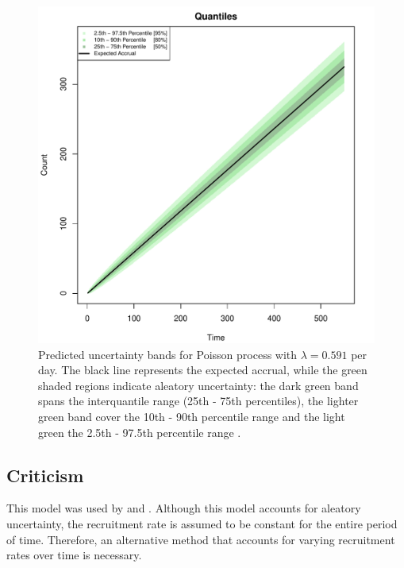 \begin{figure}
\begin{knitrout}
\color{fgcolor}

{\centering \includegraphics[width=\textwidth-3cm]{figure/ch02_figunnamed-chunk-6-1} 

}


\end{knitrout}
  \caption{Predicted uncertainty bands for Poisson process with $\lambda = 0.591$ per day. The black line represents the expected accrual, while the green shaded regions indicate aleatory uncertainty: the dark green band spans the interquantile range (25th - 75th percentiles), the lighter green band cover the 10th - 90th percentile range and the light green the 2.5th - 97.5th percentile range \citep{spiegelhalter2011visualizing}.}
  \label{fig:2_5}
\end{figure}

\subsection{Criticism}

This model was used by \cite{carter2004application} and \cite{carter2005practical}. Although this model accounts for aleatory uncertainty, the recruitment rate is assumed to be constant for the entire period of time. Therefore, an alternative method that accounts for varying recruitment rates over time is necessary.

